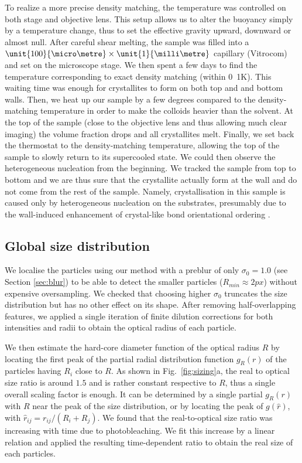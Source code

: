\documentclass[8.5pt,twoside,twocolumn]{article}
\begin{document}
To realize a more precise density matching, the temperature was controlled on both stage and objective lens. This setup allows us to alter the buoyancy simply by a temperature change, thus to set the effective gravity upward, downward or almost null. After careful shear melting, the sample was filled into a $\unit{100}{\micro\metre}\times\unit{1}{\milli\metre}$ capillary (Vitrocom) and set on the microscope stage. We then spent a few days to find the temperature corresponding to exact density matching (within \unit{0.1}{K}). This waiting time was enough for crystallites to form on both top and and bottom walls. Then, we heat up our sample by a few degrees compared to the density-matching temperature in order to make the colloids heavier than the solvent. At the top of the sample (close to the objective lens and thus allowing much clear imaging) the volume fraction drops and all crystallites melt. Finally, we set back the thermostat to the density-matching temperature, allowing the top of the sample to slowly return to its supercooled state. We could then observe the heterogeneous nucleation from the beginning. We tracked the sample from top to bottom and we are thus sure that the crystallite actually form at the wall and do not come from the rest of the sample. Namely, crystallisation in this sample is caused only by heterogeneous nucleation on the substrates, presumably due to the wall-induced 
enhancement of crystal-like bond orientational ordering \cite{watanabe2011}.  

\subsection{Global size distribution}

We localise the particles using our method with a preblur of only $\sigma_0=1.0$ (see Section \ref{sec:blur}) to be able to detect the smaller particles ($R_{min}\approx \unit{2}{px}$) without expensive oversampling. We checked that choosing higher $\sigma_0$ truncates the size distribution but has no other effect on its shape. After removing half-overlapping features, we applied a single iteration of finite dilution corrections for both intensities and radii to obtain the optical radius of each particle.



We then estimate the hard-core diameter function of the optical radius $R$ by locating the first peak of the partial radial distribution function $g_R(r)$ of the particles having $R_i$ close to $R$. As shown in Fig.~\ref{fig:sizing}a, the real to optical size ratio is around $1.5$ and is rather constant respective to $R$, thus a single overall scaling factor is enough. It can be determined by a single partial $g_R(r)$ with $R$ near the peak of the size distribution, or by locating the peak of $g(\hat{r})$, with $\hat{r}_{ij} = r_{ij}/(R_i+R_j)$. We found that the real-to-optical size ratio was increasing with time due to photobleaching. We fit this increase by a linear relation and applied the resulting time-dependent ratio to obtain the real size of each particles.
\end{document}
